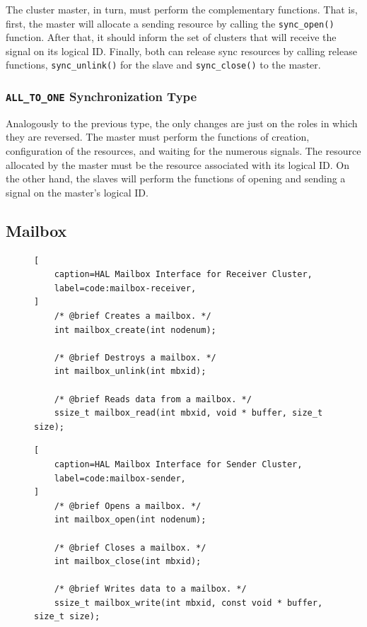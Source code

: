 				The cluster master, in turn, must perform the complementary functions.
				That is, first, the master will allocate a sending resource by calling
				the \texttt{sync\_open()} function.
				After that, it should inform the set of clusters that will receive the
				signal on its logical ID.
				Finally, both can release sync resources by calling release functions,
				\texttt{sync\_unlink()} for the slave and \texttt{sync\_close()} to
				the master.

			\subsubsection*{\texttt{ALL\_TO\_ONE} Synchronization Type}

				Analogously to the previous type, the only changes are just on
				the roles in which they are reversed.
				The master must perform the functions of creation, configuration
				of the resources, and waiting for the numerous signals.
				The resource allocated by the master must be the resource
				associated with its logical ID.
				On the other hand, the slaves will perform the functions of
				opening and sending a signal on the master's logical ID.

	\subsection{Mailbox}

\begin{figure}[t]
\begin{lstlisting}[
	caption=HAL Mailbox Interface for Receiver Cluster,
	label=code:mailbox-receiver,
]
	/* @brief Creates a mailbox. */
	int mailbox_create(int nodenum);

	/* @brief Destroys a mailbox. */
	int mailbox_unlink(int mbxid);

	/* @brief Reads data from a mailbox. */
	ssize_t mailbox_read(int mbxid, void * buffer, size_t size);
\end{lstlisting}
\end{figure}

\begin{figure}[t]
\begin{lstlisting}[
	caption=HAL Mailbox Interface for Sender Cluster,
	label=code:mailbox-sender,
]
	/* @brief Opens a mailbox. */
	int mailbox_open(int nodenum);

	/* @brief Closes a mailbox. */
	int mailbox_close(int mbxid);

	/* @brief Writes data to a mailbox. */
	ssize_t mailbox_write(int mbxid, const void * buffer, size_t size);
\end{lstlisting}
\end{figure}

